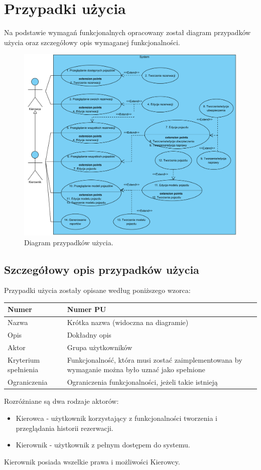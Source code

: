 \documentclass[eng,printmode,openany]{mgr}
\begin{document}
	\section{Przypadki użycia}	
	Na podstawie wymagań funkcjonalnych opracowany został diagram przypadków użycia oraz szczegółowy opis wymaganej funkcjonalności.
	\begin{figure}[H]
		\centering
		\includegraphics[width=\textwidth]{images/use_case_1.png}
		\caption{Diagram przypadków użycia.}
	\end{figure}
	\subsection{Szczegółowy opis przypadków użycia}
		Przypadki użycia zostały opisane według poniższego wzorca:
	\begin{table}[H]
		\begin{tabularx}{\textwidth}{|l|X|}
			\hline
			Numer                & Numer PU \\ \hline
			Nazwa                & Krótka nazwa (widoczna na diagramie)\\ \hline
			Opis                 & Dokładny opis\\ \hline
			Aktor                & Grupa użytkowników\\ \hline
			Kryterium spełnienia & Funkcjonalność, która musi zostać zaimplementowana by wymaganie można było uznać jako spełnione\\ \hline
			Ograniczenia         & Ograniczenia funkcjonalności, jeżeli takie istnieją\\ \hline
		\end{tabularx}
	\end{table}
	Rozróżniane są dwa rodzaje aktorów:
	\begin{itemize}
		\item Kierowca - użytkownik korzystający z funkcjonalności tworzenia i przeglądania historii rezerwacji.
		\item Kierownik - użytkownik z pełnym dostępem do systemu.
	\end{itemize}
	Kierownik posiada wszelkie prawa i możliwości Kierowcy.
	
\end{document}
